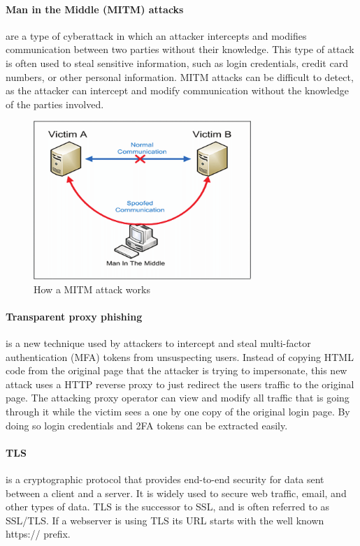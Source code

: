 \documentclass[12pt]{scrbook}
\begin{document}
\paragraph{Man in the Middle (MITM) attacks} are a type of
cyberattack in which an attacker intercepts and modifies communication between
two parties without their knowledge. This type of attack is often used to steal
sensitive information, such as login credentials, credit card numbers, or other
personal information. MITM attacks can be difficult to detect, as the attacker
can intercept and modify communication without the knowledge of the parties
involved.
\begin{figure}[!h] \centering
	\includegraphics[height=6cm]{./images/mitm_attack.png}
	\caption{How a MITM attack works}
\end{figure}

\paragraph{Transparent proxy phishing} is a new technique used by attackers to
intercept and steal
multi-factor authentication (MFA) tokens from unsuspecting users. Instead of
copying HTML code from the original page that the attacker is trying to
impersonate, this new attack uses a HTTP reverse proxy to just redirect the
users traffic to the original page. The attacking proxy operator can view and
modify all traffic that is going through it while the victim sees a one by one
copy of the original login page. By doing so login credentials and 2FA tokens
can be extracted easily.

\paragraph{TLS} is a cryptographic protocol that provides
end-to-end security for data sent between a client and a server. It is widely
used to secure web traffic, email, and other types of data. TLS is the successor
to SSL, and is often referred to as SSL/TLS. If a webserver is using TLS its URL
starts with the well known https:// prefix.
\end{document}
